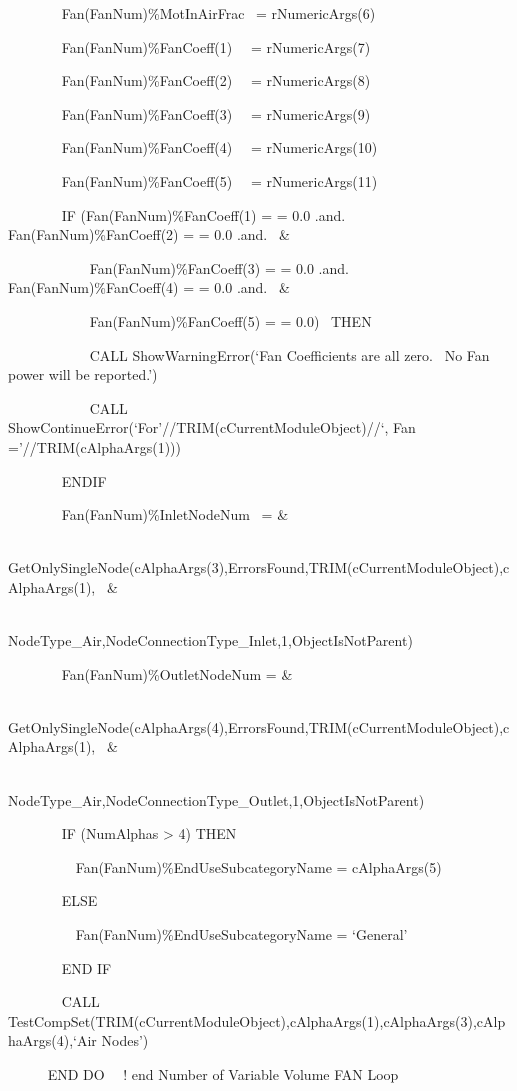 ~~~~~~~ Fan(FanNum)\%MotInAirFrac~ = rNumericArgs(6)

~~~~~~~ Fan(FanNum)\%FanCoeff(1)~~ = rNumericArgs(7)

~~~~~~~ Fan(FanNum)\%FanCoeff(2)~~ = rNumericArgs(8)

~~~~~~~ Fan(FanNum)\%FanCoeff(3)~~ = rNumericArgs(9)

~~~~~~~ Fan(FanNum)\%FanCoeff(4)~~ = rNumericArgs(10)

~~~~~~~ Fan(FanNum)\%FanCoeff(5)~~ = rNumericArgs(11)

~~~~~~~ IF (Fan(FanNum)\%FanCoeff(1) = = 0.0 .and. Fan(FanNum)\%FanCoeff(2) = = 0.0 .and.~ \&

~~~~~~~~~~~ Fan(FanNum)\%FanCoeff(3) = = 0.0 .and. Fan(FanNum)\%FanCoeff(4) = = 0.0 .and.~ \&

~~~~~~~~~~~ Fan(FanNum)\%FanCoeff(5) = = 0.0)~ THEN

~~~~~~~~~~~ CALL ShowWarningError(`Fan Coefficients are all zero.~ No Fan power will be reported.')

~~~~~~~~~~~ CALL ShowContinueError(`For'//TRIM(cCurrentModuleObject)//`, Fan ='//TRIM(cAlphaArgs(1)))

~~~~~~~ ENDIF

~~~~~~~ Fan(FanNum)\%InletNodeNum~ = \&

~~~~~~~~~~~~~~ GetOnlySingleNode(cAlphaArgs(3),ErrorsFound,TRIM(cCurrentModuleObject),cAlphaArgs(1),~ \&

~~~~~~~~~~~~~~~~~~~~~~~~~~~ NodeType\_Air,NodeConnectionType\_Inlet,1,ObjectIsNotParent)

~~~~~~~ Fan(FanNum)\%OutletNodeNum = \&

~~~~~~~~~~~~~~ GetOnlySingleNode(cAlphaArgs(4),ErrorsFound,TRIM(cCurrentModuleObject),cAlphaArgs(1),~ \&

~~~~~~~~~~~~~~~~~~~~~~~~~~~ NodeType\_Air,NodeConnectionType\_Outlet,1,ObjectIsNotParent)

~~~~~~~ IF (NumAlphas \textgreater{} 4) THEN

~~~~~~~~~ Fan(FanNum)\%EndUseSubcategoryName = cAlphaArgs(5)

~~~~~~~ ELSE

~~~~~~~~~ Fan(FanNum)\%EndUseSubcategoryName = `General'

~~~~~~~ END IF

~~~~~~~ CALL TestCompSet(TRIM(cCurrentModuleObject),cAlphaArgs(1),cAlphaArgs(3),cAlphaArgs(4),`Air Nodes')

~~~~~ END DO~~ ! end Number of Variable Volume FAN Loop

